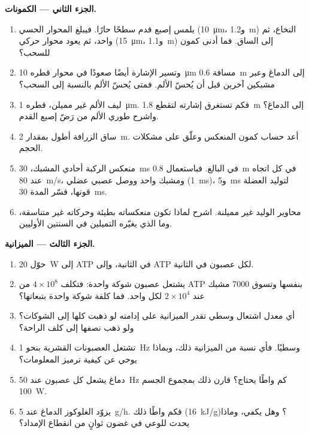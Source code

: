 \begin{problem}
\medskip
\noindent\textbf{الجزء الثاني --- الكمونات.}
\begin{enumerate}[resume]
  \item يلمس إصبع قدم سطحًا حارًا. فيبلغ المحوار الحسي
        (\qty{10}{\micro m}، و\qty{1.2}{m}) النخاع، ثم  واحد، ثم يعود محوار حركي (\qty{15}{\micro m}،
        و\qty{1.1}{m}) إلى الساق. فما أدنى كمون للسحب؟
  \item وتسير الإشارة أيضًا صعودًا في محوار قطره
        \qty{10}{\micro m} مسافة \qty{0.6}{m} إلى الدماغ وعبر
        مشبكين آخرين قبل أن يُحسّ الألم. فمتى يُحسّ الألم
        بالنسبة إلى السحب؟
  \item ليف الألم غير مميلن، قطره \qty{1}{\micro m}. فكم
        تستغرق إشارته لتقطع \qty{1.8}{m} إلى الدماغ؟ واشرح
        طوري الألم من رَضّ إصبع القدم.
  \item ساق الزرافة أطول بمقدار \qty{2}{m}. أعد حساب كمون
        المنعكس وعلّق على مشكلات الحجم.
  \item منعكس الركبة أحادي المشبك، \qty{30}{ms} في البالغ.
        فباستعمال \qty{0.8}{m} في كل اتجاه عند \qty{80}{m/s}،
        ومشبك واحد ووصل عصبي عضلي (\qty{1}{ms})، و\qty{5}{ms}
        لتوليد العضلة قوتها، فسّر المدة \qty{30}{ms}.
  \item محاوير الوليد غير مميلنة. اشرح لماذا تكون منعكساته
        بطيئة وحركاته غير متناسقة، وما الذي يغيّره التميلين
        في السنتين الأوليين.
\end{enumerate}

\medskip
\noindent\textbf{الجزء الثالث --- الميزانية.}
\begin{enumerate}[resume]
  \item حوّل \qty{20}{W} إلى ATP في الثانية، وإلى ATP لكل
        عصبون في الثانية.
  \item يشتعل عصبون شوكة واحدة: فتكلف $4\times 10^{8}$ من ATP
        بنفسها وتسوق \num{7000} مشبك عند $2\times 10^{4}$ لكل
        واحد. فما كلفة شوكة واحدة بتبعاتها؟
  \item أي معدل اشتعال وسطي تقدر الميزانية على إدامته لو
        ذهبت كلها إلى الشوكات؟ ولو ذهب نصفها إلى كلف الراحة؟
  \item تشتعل العصبونات القشرية بنحو \qty{1}{Hz} وسطيًا. فأي
        نسبة من الميزانية ذلك، وبماذا يوحي عن كيفية ترميز
        المعلومات؟
  \item دماغ يشعل كل عصبون عند \qty{50}{Hz} كم واطًا يحتاج؟
        قارن ذلك بمجموع الجسم \qty{100}{W}.
  \item يزوّد الغلوكوز الدماغ عند \qty{5}{g/h}. فكم واطًا
        ذلك (\qty{16}{kJ/g})؟ وهل يكفي، وماذا يحدث للوعي في
        غضون ثوانٍ من انقطاع الإمداد؟
\end{enumerate}


\end{problem}
